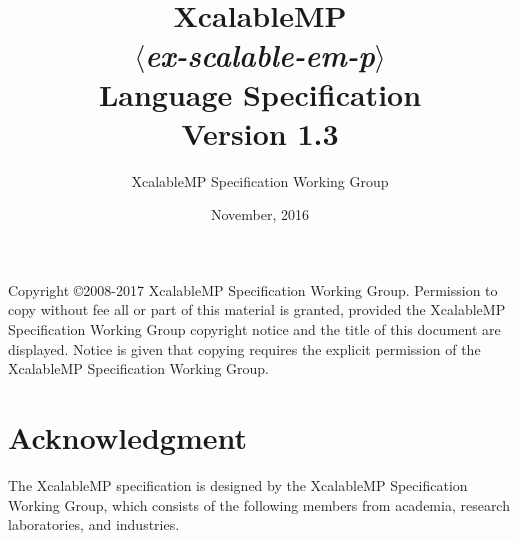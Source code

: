 \documentclass[a4paper,11pt,twoside]{report}
\title{{\Huge XcalableMP}\\
$\langle${\it ex-scalable-em-p}$\rangle$\\
Language Specification\\
\vspace{2cm}
Version 1.3\\}
\author{
\Large XcalableMP Specification Working Group\\
}
\date{\vspace{4cm}\Large November, 2016}
\def\XMP{XcalableMP}
\begin{document}
\maketitle

Copyright \copyright 2008-2017 {\XMP} Specification Working Group.
Permission to copy without fee all or part of this material is granted,
provided the {\XMP} Specification Working Group copyright notice and the
title of this document are displayed. Notice is given that copying
requires the explicit permission of the {\XMP} Specification Working
Group.

\clearpage

\cleardoublepage

\tableofcontents
\listoffigures
\listoftables

\chapter*{Acknowledgment}

The {\XMP} specification is designed by the {\XMP} Specification
Working Group, which consists of the following members from academia,
research laboratories, and industries.
\end{document}
